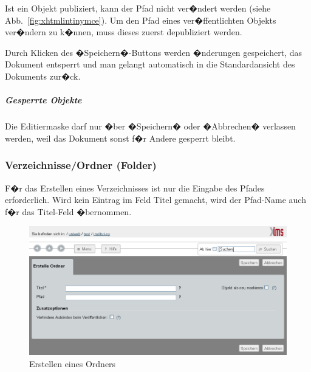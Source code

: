 \begin{Hinweis}
  Ist ein Objekt publiziert, kann 
  der Pfad
  nicht
  ver�ndert werden (siehe Abb.~\ref{fig:xhtmlintinymce}). Um 
  den Pfad
  eines ver�ffentlichten Objekts ver�ndern zu
  k�nnen, muss dieses zuerst depubliziert werden.
\end{Hinweis}

Durch Klicken des �Speichern�-Buttons werden �nderungen gespeichert,
das Dokument entsperrt und man gelangt automatisch in die
Standardansicht des Dokuments zur�ck.

\subparagraph{Gesperrte Objekte}
\label{gesperrteobjekte}

Die Editiermaske darf nur �ber �Speichern� oder �Abbrechen� verlassen
werden, weil das Dokument sonst f�r Andere gesperrt bleibt.

\subsubsection{Verzeichnisse/Ordner (Folder)}
\label{ordner}

F�r das Erstellen eines Verzeichnisses ist nur die Eingabe 
des Pfades
erforderlich. Wird kein Eintrag im Feld Titel gemacht, wird der 
Pfad-Name
auch f�r das Titel-Feld �bernommen.

\begin{figure}[!ht]
  \centering
  \includegraphics[width=\textwidth]{./images/erstellefolder.png}
  \caption{Erstellen eines Ordners}
  \label{fig:erstellefolder}
\end{figure}


